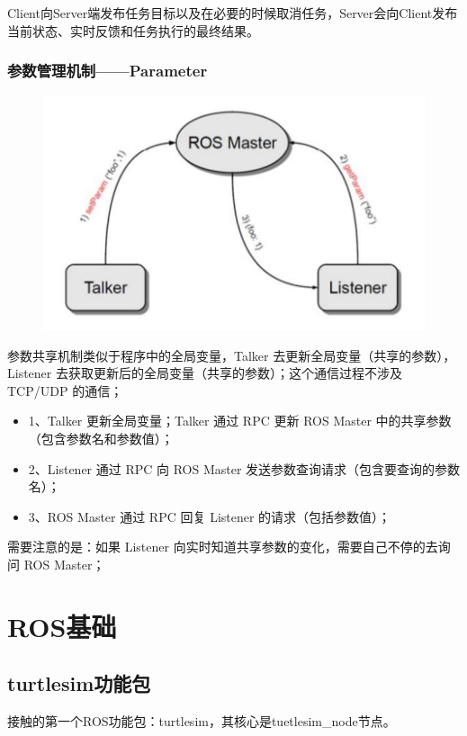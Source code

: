 \documentclass[9pt, oneside]{book}
\begin{document}
Client向Server端发布任务目标以及在必要的时候取消任务，Server会向Client发布当前状态、实时反馈和任务执行的最终结果。


\subsection{参数管理机制——Parameter}

\begin{figure}[H]
    \centering
    \includegraphics[width=0.7\linewidth]{image/参数管理机制.jpg}
\end{figure}

参数共享机制类似于程序中的全局变量，Talker 去更新全局变量（共享的参数），Listener 去获取更新后的全局变量（共享的参数）；这个通信过程不涉及 TCP/UDP 的通信；     

\begin{itemize}
    \item 1、Talker 更新全局变量；Talker 通过 RPC 更新 ROS Master 中的共享参数（包含参数名和参数值）；
    \item 2、Listener 通过 RPC 向 ROS Master 发送参数查询请求（包含要查询的参数名）；
    \item 3、ROS Master 通过 RPC 回复 Listener 的请求（包括参数值）；
\end{itemize}

需要注意的是：如果 Listener 向实时知道共享参数的变化，需要自己不停的去询问 ROS Master；

\chapter{ROS基础}

\section{turtlesim功能包}

接触的第一个ROS功能包：turtlesim，其核心是tuetlesim\_node节点。
\end{document}
